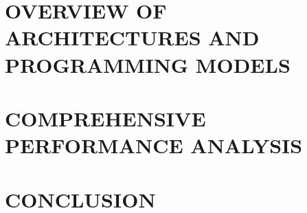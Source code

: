 \documentclass[10pt,pageno]{jpaper}
\begin{document}
\section{OVERVIEW OF ARCHITECTURES AND PROGRAMMING MODELS}
\label{sec:OVERVIEW}


\section{COMPREHENSIVE PERFORMANCE ANALYSIS}
\label{sec:PERFORMANCE}


\section{CONCLUSION}
\label{sec:CONCLUSION}




\end{document}
